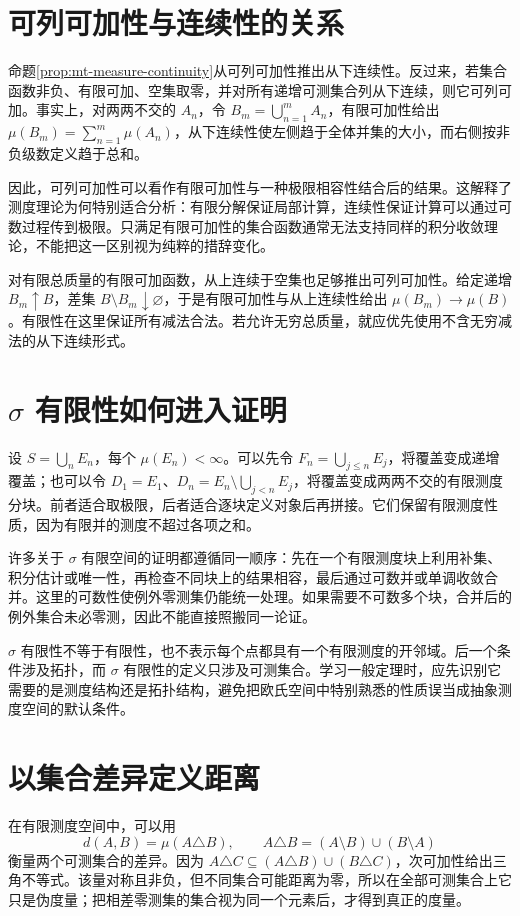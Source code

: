 \documentclass[UTF8,12pt,a4paper,fontset=fandol]{ctexbook}
\begin{document}
\section{可列可加性与连续性的关系}
命题\ref{prop:mt-measure-continuity}从可列可加性推出从下连续性。反过来，若集合函数非负、有限可加、空集取零，并对所有递增可测集合列从下连续，则它可列可加。事实上，对两两不交的 $A_n$，令 $B_m=\bigcup_{n=1}^{m}A_n$，有限可加性给出 $\mu(B_m)=\sum_{n=1}^{m}\mu(A_n)$，从下连续性使左侧趋于全体并集的大小，而右侧按非负级数定义趋于总和。

因此，可列可加性可以看作有限可加性与一种极限相容性结合后的结果。这解释了测度理论为何特别适合分析：有限分解保证局部计算，连续性保证计算可以通过可数过程传到极限。只满足有限可加性的集合函数通常无法支持同样的积分收敛理论，不能把这一区别视为纯粹的措辞变化。

对有限总质量的有限可加函数，从上连续于空集也足够推出可列可加性。给定递增 $B_m\uparrow B$，差集 $B\setminus B_m\downarrow\varnothing$，于是有限可加性与从上连续性给出 $\mu(B_m)\to\mu(B)$。有限性在这里保证所有减法合法。若允许无穷总质量，就应优先使用不含无穷减法的从下连续形式。

\section{$\sigma$ 有限性如何进入证明}
设 $S=\bigcup_nE_n$，每个 $\mu(E_n)<\infty$。可以先令 $F_n=\bigcup_{j\leq n}E_j$，将覆盖变成递增覆盖；也可以令 $D_1=E_1$、$D_n=E_n\setminus\bigcup_{j<n}E_j$，将覆盖变成两两不交的有限测度分块。前者适合取极限，后者适合逐块定义对象后再拼接。它们保留有限测度性质，因为有限并的测度不超过各项之和。

许多关于 $\sigma$ 有限空间的证明都遵循同一顺序：先在一个有限测度块上利用补集、积分估计或唯一性，再检查不同块上的结果相容，最后通过可数并或单调收敛合并。这里的可数性使例外零测集仍能统一处理。如果需要不可数多个块，合并后的例外集合未必零测，因此不能直接照搬同一论证。

$\sigma$ 有限性不等于有限性，也不表示每个点都具有一个有限测度的开邻域。后一个条件涉及拓扑，而 $\sigma$ 有限性的定义只涉及可测集合。学习一般定理时，应先识别它需要的是测度结构还是拓扑结构，避免把欧氏空间中特别熟悉的性质误当成抽象测度空间的默认条件。

\section{以集合差异定义距离}
在有限测度空间中，可以用
\[
 d(A,B)=\mu(A\triangle B),\qquad
 A\triangle B=(A\setminus B)\cup(B\setminus A)
\]
衡量两个可测集合的差异。因为 $A\triangle C\subseteq(A\triangle B)\cup(B\triangle C)$，次可加性给出三角不等式。该量对称且非负，但不同集合可能距离为零，所以在全部可测集合上它只是伪度量；把相差零测集的集合视为同一个元素后，才得到真正的度量。
\end{document}
